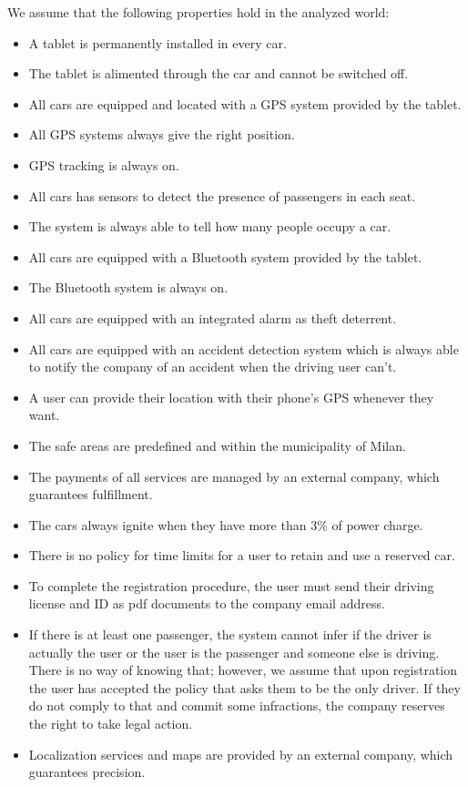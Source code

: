 We assume that the following properties hold in the analyzed world:			
			
			\begin{itemize}
				\item A tablet is permanently installed in every car. %
				\item The tablet is alimented through the car and cannot be switched off.
				\item All cars are equipped and located with a GPS system provided by the tablet.
				\item All GPS systems always give the right position.
				\item GPS tracking is always on.
				\item All cars has sensors to detect the presence of passengers in each seat.
				\item The system is always able to tell how many people occupy a car.
				\item All cars are equipped with a Bluetooth system provided by the tablet.
				\item The Bluetooth system is always on.
				\item All cars are equipped with an integrated alarm as theft deterrent. %
				\item All cars are equipped with an accident detection system which is always able to notify the company of an accident when the driving user can't. 
				\item A user can provide their location with their phone's GPS whenever they want. 
				\item The safe areas are predefined and within the municipality of Milan.
				\item The payments of all services are managed by an external company, which guarantees fulfillment.
				\item The cars always ignite when they have more than 3\% of power charge.
				\item There is no policy for time limits for a user to retain and use a reserved car. %
				\item To complete the registration procedure, the user must send their driving license and ID as pdf documents to the company email address.
				\item If there is at least one passenger, the system cannot infer if the driver is actually the user or the user is the passenger and someone else is driving. There is no way of knowing that; however, we assume that upon registration the user has accepted the policy that asks them to be the only driver. If they do not comply to that and commit some infractions, the company reserves the right to take legal action. %
				\item Localization services and maps are provided by an external company, which guarantees precision. 
				
			\end{itemize}